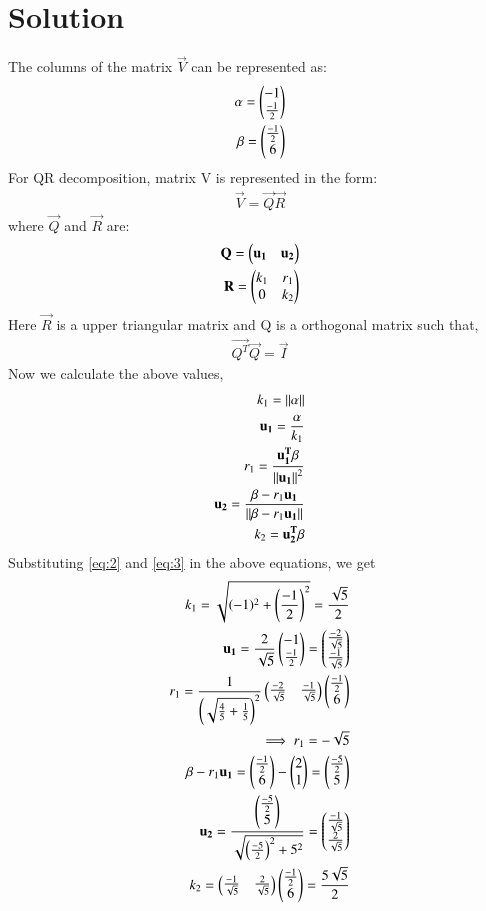 \documentclass[journal,12pt,twocolumn]{IEEEtran}
\begin{document}
\section{Solution}
The columns of the matrix $\vec{V}$ can be represented as:
\begin{align}
\alpha=\begin{pmatrix}-1\\\frac{-1}{2}\end{pmatrix}\label{eq:2}\\
\beta=\begin{pmatrix}\frac{-1}{2}\\6\end{pmatrix}\label{eq:3}
\end{align}
For QR decomposition, matrix V is represented in the form:
\begin{align}
    \Vec{V}=\vec{Q}\vec{R}
\end{align}
where $\vec{Q}$ and $\Vec{R}$ are:
\begin{align}
    \vec{Q}=\myvec{\Vec{u_1} & \vec{u_2}}\label{eq:4}\\
    \vec{R}=\myvec{k_1 & r_1 \\ 0 & k_2}\label{eq:5}
\end{align}
Here $\vec{R}$ is a upper triangular matrix and Q is a orthogonal matrix such that,
\begin{align}
\vec{Q^T}\vec{Q}=\vec{I}
\end{align}
Now we calculate the above values,
\begin{align}
k_1 = \norm{\alpha}\\
\vec{u_1}=\frac{\alpha}{k_1}\\
r_1 = \frac{\vec{u_1^T}\beta}{\norm{\Vec{u_1}}^2}\\
\vec{u_2}=\frac{\beta-r_1\vec{u_1}}{\norm{\beta-r_1\vec{u_1}}}\\
k_2 = \vec{u_2^T}\beta
\end{align}
Substituting \eqref{eq:2} and \eqref{eq:3} in the above equations, we get
\begin{align}
k_1= \sqrt{(-1)^2+\left(\frac{-1}{2}\right)^2}= \frac{\sqrt{5}}{2}\\
\vec{u_1}= \frac{2}{\sqrt{5}}\myvec{-1\\\frac{-1}{2}}=\myvec{\frac{-2}{\sqrt{5}}\\\frac{-1}{\sqrt{5}}}\\
r_1=\frac{1}{\brak{\sqrt{\frac{4}{5}+\frac{1}{5}}}^2}\myvec{\frac{-2}{\sqrt{5}}&\frac{-1}{\sqrt{5}}}\myvec{\frac{-1}{2}\\6}\\
\implies r_1= -\sqrt{5}\\
\beta-r_1\vec{u_1}=\myvec{\frac{-1}{2}\\6}-\myvec{2\\1}=\myvec{\frac{-5}{2}\\5}\\
\Vec{u_2}=\frac{\myvec{\frac{-5}{2}\\5}}{\sqrt{\left(\frac{-5}{2}\right)^2+5^2}}=\myvec{\frac{-1}{\sqrt{5}}\\\frac{2}{\sqrt{5}}}\\
k_2 = \myvec{\frac{-1}{\sqrt{5}}&\frac{2}{\sqrt{5}}}\myvec{\frac{-1}{2}\\6}= \frac{5\sqrt{5}}{2}
\end{align}
\end{document}
